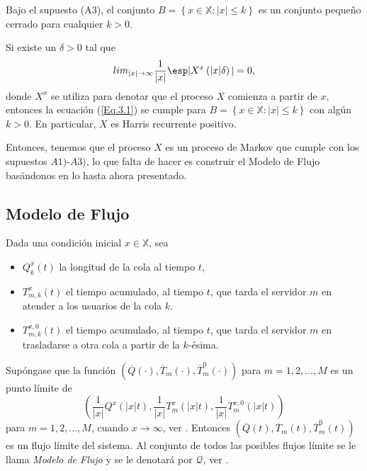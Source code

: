 \begin{Lema}\label{Lema.3.}
Bajo el supuesto (A3), el conjunto
$B=\left\{x\in\mathbb{X}:|x|\leq k\right\}$ es un conjunto
peque\~no cerrado para cualquier $k>0$.
\end{Lema}

\begin{Teo}\label{Tma.3.1}
Si existe un $\delta>0$ tal que
\begin{equation}
lim_{|x|\rightarrow\infty}\frac{1}{|x|}\esp|X^{x}\left(|x|\delta\right)|=0,
\end{equation}
donde $X^{x}$ se utiliza para denotar que el proceso $X$ comienza
a partir de $x$, entonces la ecuaci\'on (\ref{Eq.3.1}) se cumple
para $B=\left\{x\in\mathbb{X}:|x|\leq k\right\}$ con alg\'un
$k>0$. En particular, $X$ es Harris recurrente positivo.
\end{Teo}

Entonces, tenemos que el proceso $X$ es un proceso de Markov que
cumple con los supuestos $A1)$-$A3)$, lo que falta de hacer es
construir el Modelo de Flujo bas\'andonos en lo hasta ahora
presentado.
\subsection{Modelo de Flujo}

Dada una condici\'on inicial $x\in\mathbb{X}$, sea

\begin{itemize}
\item $Q_{k}^{x}\left(t\right)$ la longitud de la cola al tiempo
$t$,

\item $T_{m,k}^{x}\left(t\right)$ el tiempo acumulado, al tiempo
$t$, que tarda el servidor $m$ en atender a los usuarios de la
cola $k$.

\item $T_{m,k}^{x,0}\left(t\right)$ el tiempo acumulado, al tiempo
$t$, que tarda el servidor $m$ en trasladarse a otra cola a partir de la $k$-\'esima.\\
\end{itemize}

Sup\'ongase que la funci\'on
$\left(\overline{Q}\left(\cdot\right),\overline{T}_{m}
\left(\cdot\right),\overline{T}_{m}^{0} \left(\cdot\right)\right)$
para $m=1,2,\ldots,M$ es un punto l\'imite de
\begin{equation}\label{Eq.Punto.Limite}
\left(\frac{1}{|x|}Q^{x}\left(|x|t\right),\frac{1}{|x|}T_{m}^{x}\left(|x|t\right),\frac{1}{|x|}T_{m}^{x,0}\left(|x|t\right)\right)
\end{equation}
para $m=1,2,\ldots,M$, cuando $x\rightarrow\infty$, ver
\cite{Down}. Entonces
$\left(\overline{Q}\left(t\right),\overline{T}_{m}
\left(t\right),\overline{T}_{m}^{0} \left(t\right)\right)$ es un
flujo l\'imite del sistema. Al conjunto de todos las posibles
flujos l\'imite se le llama {\emph{Modelo de Flujo}} y se le
denotar\'a por $\mathcal{Q}$, ver \cite{Down, Dai, DaiSean}.\\


